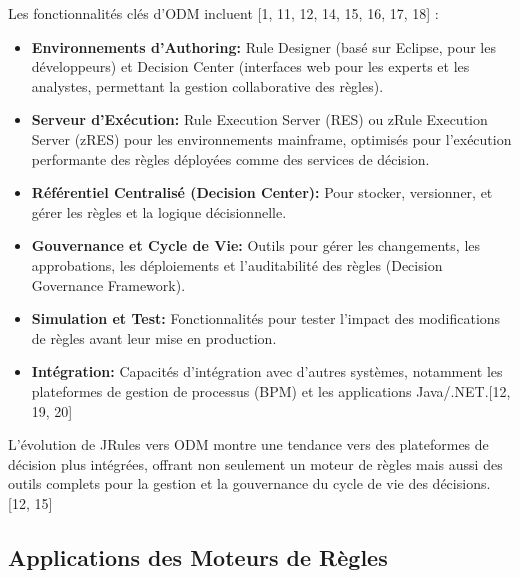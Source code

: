 \documentclass[11pt,a4paper]{article}
\begin{document}
Les fonctionnalités clés d'ODM incluent [1, 11, 12, 14, 15, 16, 17, 18] :
\begin{itemize}
    \item \textbf{Environnements d'Authoring:} Rule Designer (basé sur Eclipse, pour les développeurs) et Decision Center (interfaces web pour les experts et les analystes, permettant la gestion collaborative des règles).
    \item \textbf{Serveur d'Exécution:} Rule Execution Server (RES) ou zRule Execution Server (zRES) pour les environnements mainframe, optimisés pour l'exécution performante des règles déployées comme des services de décision.
    \item \textbf{Référentiel Centralisé (Decision Center):} Pour stocker, versionner, et gérer les règles et la logique décisionnelle.
    \item \textbf{Gouvernance et Cycle de Vie:} Outils pour gérer les changements, les approbations, les déploiements et l'auditabilité des règles (Decision Governance Framework).
    \item \textbf{Simulation et Test:} Fonctionnalités pour tester l'impact des modifications de règles avant leur mise en production.
    \item \textbf{Intégration:} Capacités d'intégration avec d'autres systèmes, notamment les plateformes de gestion de processus (BPM) et les applications Java/.NET.[12, 19, 20]
\end{itemize}
L'évolution de JRules vers ODM montre une tendance vers des plateformes de décision plus intégrées, offrant non seulement un moteur de règles mais aussi des outils complets pour la gestion et la gouvernance du cycle de vie des décisions.[12, 15]

\subsection{Applications des Moteurs de Règles}
\end{document}
